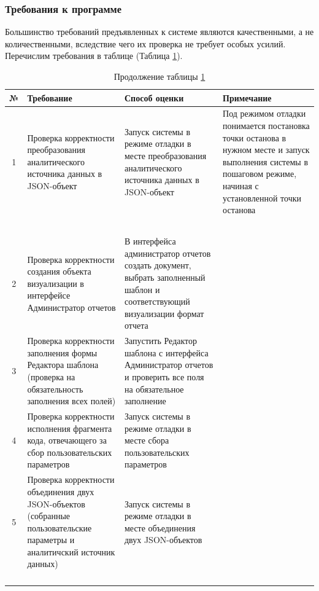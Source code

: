 \documentclass[a4paper]{extarticle}
\numberwithin{equation}{section}
\begin{document}
\subsubsection{Требования к программе}
Большинство требований предъявленных к системе являются качественными, а не количественными, вследствие чего их проверка не требует особых усилий. Перечислим требования в таблице (Таблица \ref{tableTreb}).\par
\begin{longtable}[H]{|c|p{}|p{}|p{}|}
  \caption{Требования к программе}
  \label{tableTreb}\\
  \hline
  №  & Требование & Способ оценки & Примечание \\\hline
  \endfirsthead
  1  & Проверка корректности преобразования аналитического источника данных в JSON-объект & Запуск системы в режиме отладки в месте преобразования аналитического источника данных в JSON-объект & Под режимом отладки понимается постановка точки останова в нужном месте и запуск выполнения системы в пошаговом режиме, начиная с установленной точки останова\\
    \multicolumn{4}{l}{}\\\multicolumn{4}{l}{}\\\multicolumn{4}{l}{}\\\multicolumn{4}{l}{}\\
  	\caption*{Продолжение таблицы \ref{tableTreb}} \\\hline
  2  & Проверка корректности создания объекта визуализации в интерфейсе Администратор отчетов & В интерфейса администратор отчетов создать документ, выбрать заполненный шаблон и соответствующий визуализации формат отчета & \\\hline
  3  & Проверка корректности заполнения формы Редактора шаблона (проверка на обязательность заполнения всех полей) & Запустить Редактор шаблона с интерфейса Администратор отчетов и проверить все поля на обязательное заполнение & \\\hline
  4  & Проверка корректности исполнения фрагмента кода, отвечающего за сбор пользовательских параметров & Запуск системы в режиме отладки в месте сбора пользовательских параметров & \\\hline
  5  & Проверка корректности объединения двух JSON-объектов (собранные пользовательские параметры и аналитичский источник данных) & Запуск системы в режиме отладки в месте объединения двух JSON-объектов & \\
  	\multicolumn{4}{l}{}\\\multicolumn{4}{l}{}\\\multicolumn{4}{l}{}\\\multicolumn{4}{l}{}\\

\end{longtable}
\end{document}
